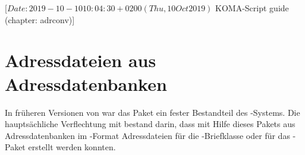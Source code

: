 %
%
%
%
%
%
%
%
% 
%
%
%
%

                 [$Date: 2019-10-10 10:04:30 +0200 (Thu, 10 Oct 2019) $
                  KOMA-Script guide (chapter: adrconv)]

\chapter{Adressdateien aus Adressdatenbanken}%
%
%
%

In früheren Versionen von \KOMAScript{} war das Paket
 ein fester Bestandteil des
\KOMAScript{}-Systems.
Die hauptsächliche Verflechtung mit \KOMAScript{}
bestand darin, dass mit Hilfe dieses Pakets aus
Adressdatenbanken im \BibTeX-Format Adressdateien
für die \KOMAScript-Briefklasse oder für das
-Paket erstellt werden konnten.

